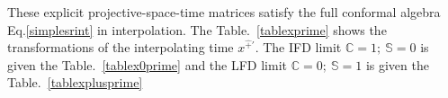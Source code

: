 \documentclass[%
 reprint,
superscriptaddress,
 amsmath,amssymb,
 aps,
]{revtex4-2}
\begin{document}
These explicit projective-space-time matrices satisfy the full conformal algebra Eq.\eqref{simplesrint} in interpolation. The Table.~\ref{tablexprime} shows the transformations of the interpolating time $x^{\hat{+}\prime}$. The IFD limit $\mathbb{C}=1;~\mathbb{S}=0$ is given the Table.~\ref{tablex0prime} and the LFD limit $\mathbb{C}=0;~\mathbb{S}=1$ is given the Table.~\ref{tablexplusprime}
\begin{center}
\begin{table}[h!]
        \centering
        \caption{Transformation of instant form time under each conformal generator in $1+1$}
        \label{tablex0prime}
    \end{table}
    \end{center}
\end{document}
